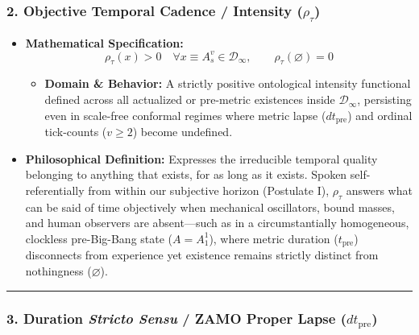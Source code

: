 \documentclass[
]{article}
\providecommand{\tightlist}{%
  \setlength{\itemsep}{0pt}\setlength{\parskip}{0pt}}
\begin{document}
\subsubsection{\texorpdfstring{2. Objective Temporal Cadence / Intensity
(\(\rho_\tau\))}{2. Objective Temporal Cadence / Intensity (\textbackslash rho\_\textbackslash tau)}}\label{objective-temporal-cadence-intensity-rho_tau}

\begin{itemize}
\tightlist
\item
  \textbf{Mathematical Specification:}
  \[\rho_\tau(x) > 0 \quad \forall x \equiv A_s^v \in \mathcal{D}_\infty, \qquad \rho_\tau(\varnothing) = 0\]

  \begin{itemize}
  \tightlist
  \item
    \textbf{Domain \& Behavior:} A strictly positive ontological
    intensity functional defined across all actualized or pre-metric
    existences inside \(\mathcal{D}_\infty\), persisting even in
    scale-free conformal regimes where metric lapse
    (\(dt_{\mathrm{pre}}\)) and ordinal tick-counts (\(v \ge 2\)) become
    undefined.
  \end{itemize}
\item
  \textbf{Philosophical Definition:} Expresses the irreducible temporal
  quality belonging to anything that exists, for as long as it exists.
  Spoken self-referentially from within our subjective horizon
  (Postulate I), \(\rho_\tau\) answers what can be said of time
  objectively when mechanical oscillators, bound masses, and human
  observers are absent---such as in a circumstantially homogeneous,
  clockless pre-Big-Bang state (\(A = A_1^1\)), where metric duration
  (\(t_{\mathrm{pre}}\)) disconnects from experience yet existence
  remains strictly distinct from nothingness (\(\varnothing\)).
\end{itemize}

\begin{center}\rule{0.5\linewidth}{0.5pt}\end{center}

\subsubsection{\texorpdfstring{3. Duration \emph{Stricto Sensu} / ZAMO
Proper Lapse
(\(dt_{\mathrm{pre}}\))}{3. Duration Stricto Sensu / ZAMO Proper Lapse (dt\_\{\textbackslash mathrm\{pre\}\})}}\label{duration-stricto-sensu-zamo-proper-lapse-dt_mathrmpre}
\end{document}
